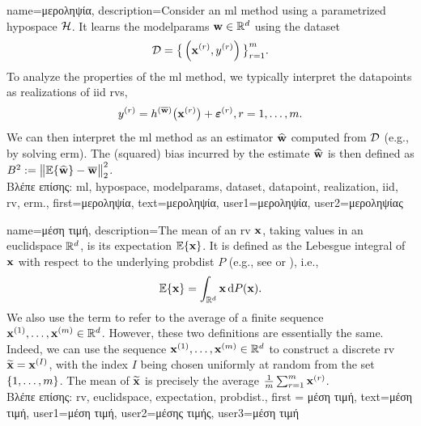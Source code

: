 {
	name={\foreignlanguage{greek}{μεροληψία}},
	description={Consider an \gls{ml} method using a parametrized \gls{hypospace} $\mathcal{H}$. 
		It learns the \gls{modelparams} ${\bf w} \in \mathbb{R}^{d}$ using the \gls{dataset} $$ \mathcal{D}=\big\{ \left( {\bf x}^{(r)},y^{(r)} \right) \big\}_{r=1}^{m}.$$ 
		To analyze the properties of the \gls{ml} method, we typically interpret the \gls{datapoint}s as \gls{realization}s 
		of \gls{iid} \gls{rv}s, $$ y^{(r)} = h^{(\overline{{\bf w}})}\big( {\bf x}^{(r)} \big) + \bm{\varepsilon}^{(r)}, r=1,\ldots,m.$$ 
		We can then interpret the \gls{ml} method as an estimator $\widehat{{\bf w}}$ 
		computed from $\mathcal{D}$ (e.g., by solving \gls{erm}). The (squared) bias incurred by the estimate $\widehat{{\bf w}}$ 
		is then defined as $B^{2} := \big\| \mathbb{E} \{ \widehat{{\bf w}}  \}- \overline{{\bf w}}\big\|_{2}^{2}$.\\
		\foreignlanguage{greek}{Βλέπε επίσης:} \gls{ml}, \gls{hypospace}, \gls{modelparams}, \gls{dataset}, \gls{datapoint}, \gls{realization}, \gls{iid}, \gls{rv}, \gls{erm}.},
first={\foreignlanguage{greek}{μεροληψία}},
text={\foreignlanguage{greek}{μεροληψία}},
user1={\foreignlanguage{greek}{μεροληψία}}, %
user2={\foreignlanguage{greek}{μεροληψίας}} %
}

{name={\foreignlanguage{greek}{μέση τιμή}},
	description={The  mean of an \gls{rv} ${\bf x}$, taking 
 values in an \gls{euclidspace} $\mathbb{R}^{d}$, is its 
 \gls{expectation} $\mathbb{E}\{{\bf x}\}$. It is defined as the Lebesgue 
 integral of ${\bf x}$ with respect to the underlying \gls{probdist} $P$ (e.g., see \cite{BillingsleyProbMeasure} or \cite{RudinBookPrinciplesMatheAnalysis}), i.e.,
\[
\mathbb{E}\{{\bf x}\} = \int_{\mathbb{R}^{d}} {\bf x} \, \mathrm{d}P({\bf x}).
\] 
We also use the term to refer to the average of a finite sequence 
${\bf x}^{(1)}, \ldots, {\bf x}^{(m)} \in \mathbb{R}^{d}$. However, 
these two definitions are essentially the same. Indeed, we can use the sequence 
${\bf x}^{(1)}, \ldots, {\bf x}^{(m)} \in \mathbb{R}^{d}$ to construct a 
discrete \gls{rv} $\widetilde{{\bf x}}={\bf x}^{(I)}$, with the index $I$ being chosen uniformly 
at random from the set $\{1,\ldots,m\}$. The mean of $\widetilde{{\bf x}}$ is 
precisely the average $\frac{1}{m} \sum_{r=1}^{m} {\bf x}^{(r)}$.\\
	\foreignlanguage{greek}{Βλέπε επίσης:} \gls{rv}, \gls{euclidspace}, \gls{expectation}, \gls{probdist}.}, 
		first = {\foreignlanguage{greek}{μέση τιμή}}, 
		text={\foreignlanguage{greek}{μέση τιμή}},
		user1={\foreignlanguage{greek}{μέση τιμή}}, %
   		user2={\foreignlanguage{greek}{μέσης τιμής}}, %
		user3={\foreignlanguage{greek}{μέση τιμή}} %
}

